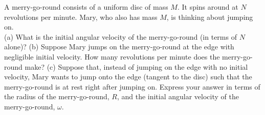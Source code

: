 A merry-go-round consists of a uniform disc of mass $M$.
It spins around at $N$
revolutions per minute. Mary, who also has mass $M$, is thinking about
jumping on.\\
%
(a) What is the initial angular velocity of the merry-go-round (in
terms of $N$ alone)?\answercheck\hwendpart
%
(b) Suppose Mary jumps on the merry-go-round at the edge with
negligible initial velocity. How many revolutions per minute does the
merry-go-round make?\answercheck\hwendpart
%
(c) Suppose that, instead of jumping on the edge with no initial
velocity, Mary wants to jump onto the edge (tangent to the disc) such
that the merry-go-round is at rest right after jumping on. Express
your answer in terms of the radius of the merry-go-round, $R$,
and the initial angular velocity of the merry-go-round, $\omega$.
\answercheck